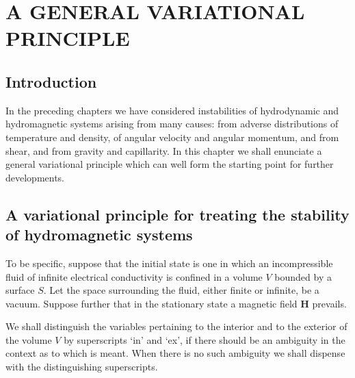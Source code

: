 \chapter{A GENERAL VARIATIONAL PRINCIPLE}
\label{ch:14}

\section{Introduction}\label{sec:121}

In the preceding chapters we have considered instabilities of hydrodynamic and hydromagnetic systems arising from many causes: from adverse distributions of temperature and density, of angular velocity and angular momentum, and from shear, and from gravity and capillarity. In this chapter we shall enunciate a general variational principle which can well form the starting point for further developments.

\section{A variational principle for treating the stability of hydromagnetic systems}\label{sec:122}

To be specific, suppose that the initial state is one in which an incompressible fluid of infinite electrical conductivity is confined in a volume $V$ bounded by a surface $S$. Let the space surrounding the fluid, either finite or infinite, be a vacuum. Suppose further that in the stationary state a magnetic field $\mathbf{H}$ prevails.

We shall distinguish the variables pertaining to the interior and to the exterior of the volume $V$ by superscripts `in' and `ex', if there should be an ambiguity in the context as to which is meant. When there is no such ambiguity we shall dispense with the distinguishing superscripts.

